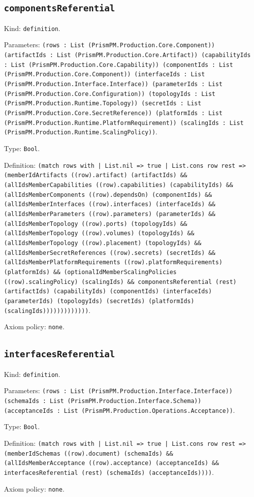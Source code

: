 \documentclass[11pt]{article}
\begin{document}
\subsection*{\texttt{componentsReferential}}
\noindent Kind: \texttt{definition}.\par
\noindent Parameters: \texttt{(rows : List (PrismPM.Production.Core.Component)) (artifactIds : List (PrismPM.Production.Core.Artifact)) (capabilityIds : List (PrismPM.Production.Core.Capability)) (componentIds : List (PrismPM.Production.Core.Component)) (interfaceIds : List (PrismPM.Production.Interface.Interface)) (parameterIds : List (PrismPM.Production.Core.Configuration)) (topologyIds : List (PrismPM.Production.Runtime.Topology)) (secretIds : List (PrismPM.Production.Core.SecretReference)) (platformIds : List (PrismPM.Production.Runtime.PlatformRequirement)) (scalingIds : List (PrismPM.Production.Runtime.ScalingPolicy))}.\par
\noindent Type: \texttt{Bool}.\par
\noindent Definition: \texttt{(match rows with | List.nil => true | List.cons row rest => (memberIdArtifacts ((row).artifact) (artifactIds) \&\& (allIdsMemberCapabilities ((row).capabilities) (capabilityIds) \&\& (allIdsMemberComponents ((row).dependsOn) (componentIds) \&\& (allIdsMemberInterfaces ((row).interfaces) (interfaceIds) \&\& (allIdsMemberParameters ((row).parameters) (parameterIds) \&\& (allIdsMemberTopology ((row).ports) (topologyIds) \&\& (allIdsMemberTopology ((row).volumes) (topologyIds) \&\& (allIdsMemberTopology ((row).placement) (topologyIds) \&\& (allIdsMemberSecretReferences ((row).secrets) (secretIds) \&\& (allIdsMemberPlatformRequirements ((row).platformRequirements) (platformIds) \&\& (optionalIdMemberScalingPolicies ((row).scalingPolicy) (scalingIds) \&\& componentsReferential (rest) (artifactIds) (capabilityIds) (componentIds) (interfaceIds) (parameterIds) (topologyIds) (secretIds) (platformIds) (scalingIds)))))))))))))}.\par
\noindent Axiom policy: \texttt{none}.\par
\subsection*{\texttt{interfacesReferential}}
\noindent Kind: \texttt{definition}.\par
\noindent Parameters: \texttt{(rows : List (PrismPM.Production.Interface.Interface)) (schemaIds : List (PrismPM.Production.Interface.Schema)) (acceptanceIds : List (PrismPM.Production.Operations.Acceptance))}.\par
\noindent Type: \texttt{Bool}.\par
\noindent Definition: \texttt{(match rows with | List.nil => true | List.cons row rest => (memberIdSchemas ((row).document) (schemaIds) \&\& (allIdsMemberAcceptance ((row).acceptance) (acceptanceIds) \&\& interfacesReferential (rest) (schemaIds) (acceptanceIds))))}.\par
\noindent Axiom policy: \texttt{none}.\par
\end{document}
